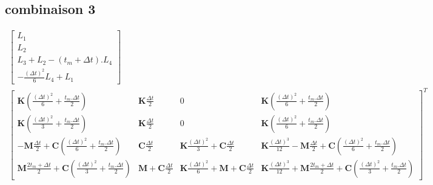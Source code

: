 \documentclass[12pt,a4paper]{report}
\begin{document}
\subsection{combinaison 3}
\begin{equation}
\!\!\!\!\!\!\!\!\!\!\!\!\!\!\!\!\!\!\!\!\!\!\!\!\!\!\!\!\!\!\!\!\!\!\!\!\!\!\!\!\!\!\!\!
\begin{array}{c}
	\begin{bmatrix}	
		  L_1
		\\L_2
		\\ L_3 + L_2 - (t_m+\Delta t).L_4
		\\ -\frac{(\Delta t)^2}{6} L_4 + L_1
	\end{bmatrix}
	\\
		\begin{bmatrix}	   
			   \mathbf{K}
				   \left( \frac{(\Delta t)^2}{6} + \frac{t_m.\Delta t}{2}
				   \right)
			&
		   		\mathbf{K} \frac{\Delta t}{2}
		   	&   
		   		0
			&
		   		\mathbf{K}
				   \left( \frac{(\Delta t)^2}{6} + \frac{t_m.\Delta t}{2}
				   \right)
		\\   
			   \mathbf{K}
				   \left( \frac{(\Delta t)^2}{3} + \frac{t_m.\Delta t}{2}
				   \right)
			&
		   		\mathbf{K} \frac{\Delta t}{2} 
		   	&
		   		0
			&
		   		\mathbf{K}
				   \left( \frac{(\Delta t)^2}{6} + \frac{t_m.\Delta t}{2}
				   \right)
		\\   
			   -\mathbf{M}
			   		\frac{\Delta t}{2} 
			   +\mathbf{C}
			   		\left( \frac{(\Delta t)^2}{6} 
			   				+ \frac{t_m.\Delta t}{2} \right)  
		   	& 
		   		\mathbf{C} \frac{\Delta t}{2}
		   	&
			   	\mathbf{K}
			   		\frac{(\Delta t)^2}{3} 
		   		+\mathbf{C} \frac{\Delta t}{2}
		   	&
		   		\mathbf{K} \frac{(\Delta t)^3}{12}
		   		-\mathbf{M}
			   		\frac{\Delta t}{2} 
			   +\mathbf{C}
			   		\left( \frac{(\Delta t)^2}{6} 
			   				+ \frac{t_m.\Delta t}{2} \right)  
		\\   
			   \mathbf{M}
			   		\frac{2t_m + \Delta t}{2} 
			   +\mathbf{C}
			   		\left( \frac{(\Delta t)^2}{3} 
			   				+ \frac{t_m.\Delta t}{2}\right)
		   	&
			   \mathbf{M} 
			   +\mathbf{C} \frac{\Delta t}{2}
		   	&
		   		\mathbf{K} \frac{(\Delta t)^2}{6} 
		   		+\mathbf{M} 
			   	+\mathbf{C} \frac{\Delta t}{2}
		   	&
		   		\mathbf{K} \frac{(\Delta t)^3}{12}
		   		+\mathbf{M}
			   		\frac{2t_m + \Delta t}{2} 
			   +\mathbf{C}
			   		\left( \frac{(\Delta t)^2}{3} 
			   				+ \frac{t_m.\Delta t}{2}\right)
	\end{bmatrix}^T
\end{array}
\end{equation}
\end{document}
